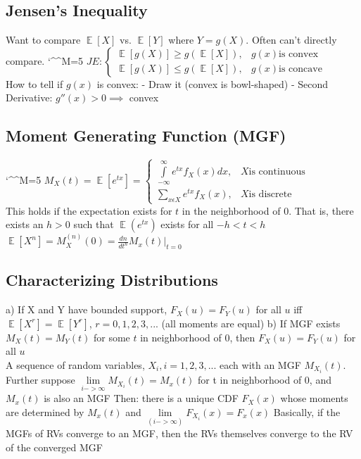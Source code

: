 \documentclass[twocolumn]{article}
\def\disobeylines{\catcode`\^^M=5 } %
\DeclareMathOperator{\EX}{\mathbb{E}} %
\let\Oldint=\int
\let\Oldsum=\sum
\let\Oldlim=\lim
\renewcommand{\int}{\Oldint\limits}
\renewcommand{\sum}{\Oldsum\limits}
\renewcommand{\lim}{\Oldlim\limits}
\newcommand{\infint}{\int_{-\infty}^{\infty}} %
\begin{document}
\subsection*{Jensen's Inequality}
Want to compare $\EX[X]$ vs. $\EX[Y]$ where $Y = g(X)$. Often can't directly compare.
\disobeylines
\begin{math}
  JE: \left\{
    \begin{array}{ll}
      \EX[g(X)] \ge g(\EX[X]), & g(x) \text{is convex}\\
      \EX[g(X)] \le g(\EX[X]), & g(x) \text{is concave}
    \end{array}
  \right.
\end{math}
\obeylines\\

How to tell if $g(x)$ is convex:
- Draw it (convex is bowl-shaped)
- Second Derivative: $g''(x) > 0 \implies $ convex


\subsection*{Moment Generating Function (MGF)}
\disobeylines
\begin{math}
  M_X(t) = \EX[e^{tx}] =  \left\{
    \begin{array}{ll}
      \infint e^{tx} f_X(x) dx, & X \text{is continuous}\\
      \sum_{x \epsilon X} e^{tx} f_X(x), & X \text{is discrete}
    \end{array}
  \right.
\end{math}
\obeylines\\

This holds if the expectation exists for $t$ in the neighborhood of 0. That is, there exists an $h > 0$ such that $\EX(e^{tx})$ exists for all $-h < t < h$\\

$\EX[X^n] = M_X^{(n)}(0) = \frac{dn}{dt^n} M_x(t) |_{t=0}$


\subsection*{Characterizing Distributions}
a) If X and Y have bounded support, $F_X(u) = F_Y(u)$ for all $u$ iff $\EX[X^r] = \EX[Y^r]$, $r = 0, 1, 2, 3, ...$ (all moments are equal)
b) If MGF exists $M_X(t) = M_Y(t)$ for some $t$ in neighborhood of 0, then $F_X(u) = F_Y(u)$ for all $u$\\


A sequence of random variables, ${X_i, i = 1, 2, 3, ...}$ each with an MGF $M_{X_i} (t)$. Further suppose $\lim_{i->\infty} M_{X_i} (t) = M_x (t)$ for t in neighborhood of 0, and $M_x(t)$ is also an MGF
Then: there is a unique CDF $F_X(x)$ whose moments are determined by $M_x (t)$ and $\lim_(i->\infty) F_{X_i} (x) = F_x (x)$
Basically, if the MGFs of RVs converge to an MGF, then the RVs themselves converge to the RV of the converged MGF\\
\end{document}
